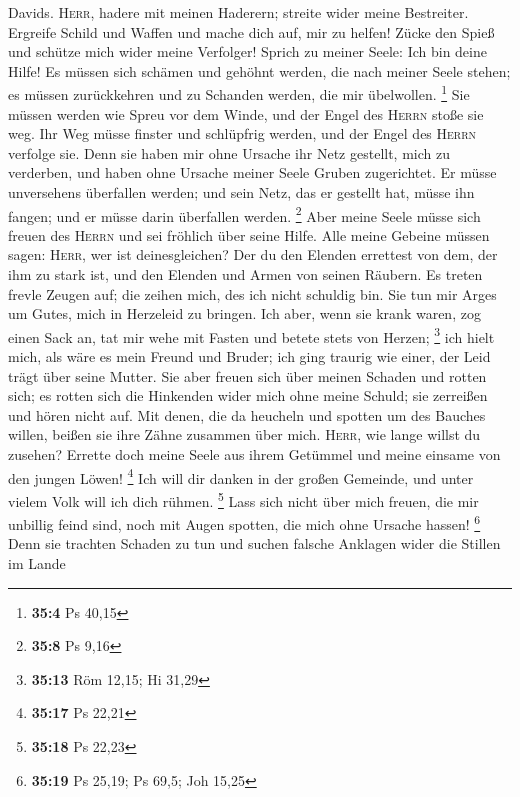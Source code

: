 Davids. \textsc{Herr}, hadere mit meinen Haderern; streite wider meine
Bestreiter.  Ergreife Schild und Waffen und mache dich
auf, mir zu helfen!  Zücke den Spieß und schütze mich
wider meine Verfolger! Sprich zu meiner Seele: Ich bin deine Hilfe!
 Es müssen sich schämen und gehöhnt werden, die nach
meiner Seele stehen; es müssen zurückkehren und zu Schanden werden, die
mir übelwollen. \footnote{\textbf{35:4} Ps 40,15}  Sie
müssen werden wie Spreu vor dem Winde, und der Engel des \textsc{Herrn}
stoße sie weg.  Ihr Weg müsse finster und schlüpfrig
werden, und der Engel des \textsc{Herrn} verfolge sie. 
Denn sie haben mir ohne Ursache ihr Netz gestellt, mich zu verderben,
und haben ohne Ursache meiner Seele Gruben zugerichtet. 
Er müsse unversehens überfallen werden; und sein Netz, das er gestellt
hat, müsse ihn fangen; und er müsse darin überfallen werden. \footnote{\textbf{35:8}
  Ps 9,16}  Aber meine Seele müsse sich freuen des
\textsc{Herrn} und sei fröhlich über seine Hilfe.  Alle
meine Gebeine müssen sagen: \textsc{Herr}, wer ist deinesgleichen? Der
du den Elenden errettest von dem, der ihm zu stark ist, und den Elenden
und Armen von seinen Räubern.  Es treten frevle Zeugen
auf; die zeihen mich, des ich nicht schuldig bin.  Sie
tun mir Arges um Gutes, mich in Herzeleid zu bringen. 
Ich aber, wenn sie krank waren, zog einen Sack an, tat mir wehe mit
Fasten und betete stets von Herzen; \footnote{\textbf{35:13} Röm 12,15;
  Hi 31,29}  ich hielt mich, als wäre es mein Freund und
Bruder; ich ging traurig wie einer, der Leid trägt über seine Mutter.
 Sie aber freuen sich über meinen Schaden und rotten
sich; es rotten sich die Hinkenden wider mich ohne meine Schuld; sie
zerreißen und hören nicht auf.  Mit denen, die da
heucheln und spotten um des Bauches willen, beißen sie ihre Zähne
zusammen über mich.  \textsc{Herr}, wie lange willst du
zusehen? Errette doch meine Seele aus ihrem Getümmel und meine einsame
von den jungen Löwen! \footnote{\textbf{35:17} Ps 22,21} 
Ich will dir danken in der großen Gemeinde, und unter vielem Volk will
ich dich rühmen. \footnote{\textbf{35:18} Ps 22,23}  Lass
sich nicht über mich freuen, die mir unbillig feind sind, noch mit Augen
spotten, die mich ohne Ursache hassen! \footnote{\textbf{35:19} Ps
  25,19; Ps 69,5; Joh 15,25}  Denn sie trachten Schaden
zu tun und suchen falsche Anklagen wider die Stillen im Lande
